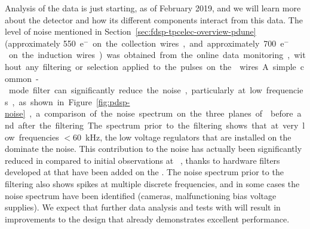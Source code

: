 Analysis of the  data
is just starting, as of February 2019, and %
we will learn more about the detector and how its different components %
interact %
from this data. The level of noise mentioned in Section~\ref{sec:fdsp-tpcelec-overview-pdune}
(approximately \SI{550}{e$^-$} on the collection wires,
and approximately \SI{700}{e$^-$} on the induction wires) 
was obtained from the online data monitoring, without any
filtering or selection applied to the pulses on the 
wires. A simple common-mode filter can significantly reduce the 
noise, particularly at low frequencies, as shown in Figure~\ref{fig:pdsp-noise},  
a comparison of the noise spectrum on the three planes of  before and after the filtering. 
The spectrum prior to
the filtering shows %
that at very low
frequencies $<$\SI{60}{kHz}, the %
low voltage regulators that are installed on the  dominate the noise. 
This contribution to the noise has actually
been significantly reduced in  compared to
initial observations at ~\cite{Acciarri:2017sde},
thanks to hardware filters developed at  that have been
added on the  . The noise spectrum prior to the
filtering also shows spikes at multiple discrete frequencies, and in
some cases the noise spectrum  have been identified (cameras,
malfunctioning bias voltage supplies). We expect that further data analysis
and %
tests with  %
will result in improvements to the %
  design that already demonstrates excellent performance.
